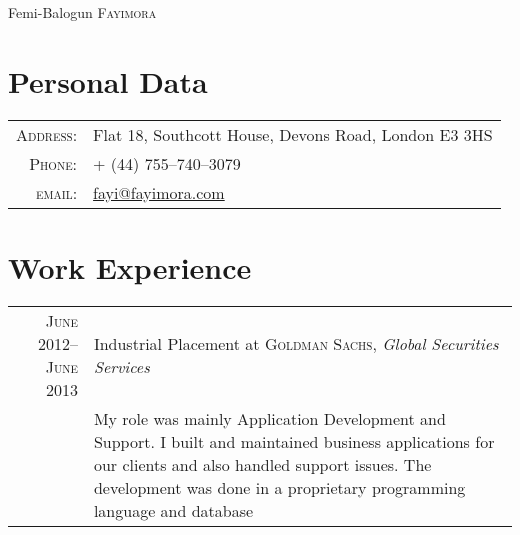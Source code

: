 \documentclass[a4paper,10pt]{article}
\begin{document}
\pagestyle{empty} %


\par{\centering
  {\Huge Femi-Balogun \textsc{Fayimora}
}\bigskip\par}

\section{Personal Data}

\begin{tabular}{rl}
  \textsc{Address:}   & Flat 18, Southcott House, Devons Road, London E3 3HS \\
  \textsc{Phone:}     & + (44) 755--740--3079 \\
  \textsc{email:}     & \href{mailto:fayi@fayimora.com}{fayi@fayimora.com}
\end{tabular}

\section{Work Experience}
\begin{tabular}{r|p{11cm}}
  \textsc{June 2012--June 2013} & Industrial Placement at \textsc{Goldman Sachs}, \emph{Global
  Securities Services}\\&

  \footnotesize{My role was mainly Application Development and Support. I built and maintained
    business applications for our clients and also handled support issues. The development was done
    in a proprietary programming language and database}
\end{tabular}

\end{document}
